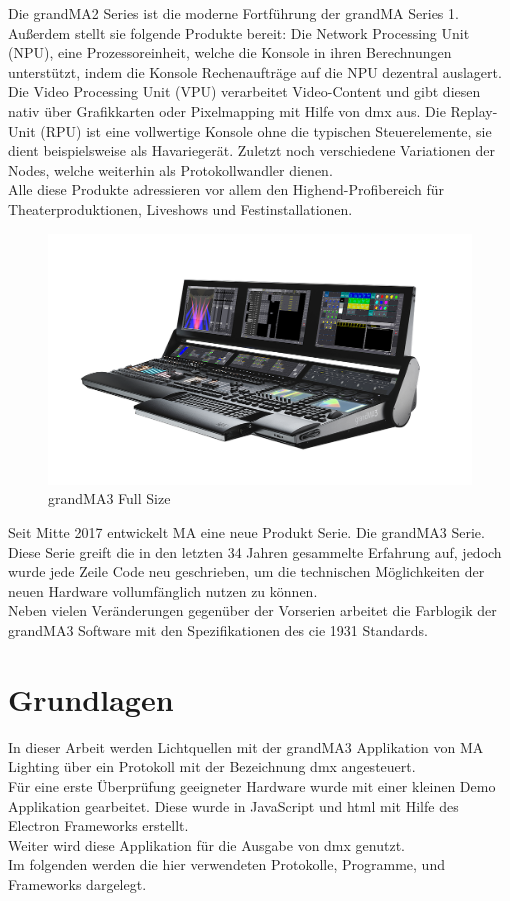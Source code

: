 \documentclass[11pt]{scrartcl}
\begin{document}
\noindent
Die grandMA2 Series ist die moderne Fortführung der grandMA Series 1. Außerdem stellt sie
folgende Produkte bereit: Die Network Processing Unit (NPU), eine Prozessoreinheit, welche die
Konsole in ihren Berechnungen unterstützt, indem die Konsole Rechenaufträge auf die NPU dezentral
auslagert. Die Video Processing Unit (VPU) verarbeitet Video-Content und gibt diesen nativ über
Grafikkarten oder Pixelmapping mit Hilfe von \ac{dmx} aus. Die Replay-Unit (RPU) ist eine vollwertige
Konsole ohne die typischen Steuerelemente, sie dient beispielsweise als Havariegerät. Zuletzt noch
verschiedene Variationen der Nodes, welche weiterhin als Protokollwandler dienen.\\
Alle diese Produkte adressieren vor allem den Highend-Profibereich für Theaterproduktionen,
Liveshows und Festinstallationen.\\
\begin{figure}[H]
    \includegraphics[width=\textwidth]{images/grandMA3-full-size.png}
    \caption{grandMA3 Full Size}\label{fig:gma3}
\end{figure}
\noindent
Seit Mitte 2017 entwickelt MA eine neue Produkt Serie. Die grandMA3 Serie. Diese Serie greift die
in den letzten 34 Jahren gesammelte Erfahrung auf, jedoch wurde jede Zeile Code neu geschrieben,
um die technischen Möglichkeiten der neuen Hardware vollumfänglich nutzen zu können.\\
Neben vielen Veränderungen gegenüber der Vorserien arbeitet die Farblogik der grandMA3 Software
mit den Spezifikationen des \ac{cie} 1931 Standards.
\clearpage

\section{Grundlagen}
In dieser Arbeit werden Lichtquellen mit der grandMA3 Applikation von MA Lighting über ein Protokoll
mit der Bezeichnung \ac{dmx} angesteuert.\\
Für eine erste Überprüfung geeigneter Hardware wurde mit einer kleinen Demo Applikation gearbeitet. Diese wurde
in JavaScript und \ac{html} mit Hilfe des Electron Frameworks erstellt.\\
Weiter wird diese Applikation für die Ausgabe von \ac{dmx} genutzt.\\
Im folgenden werden die hier verwendeten Protokolle, Programme, und Frameworks dargelegt.
\end{document}
